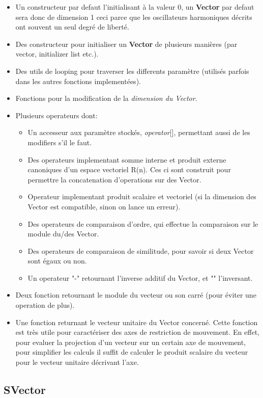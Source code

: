 \documentclass{report}
\begin{document}
\begin{itemize}
\item Un constructeur par defaut l'initialisant à la valeur {0}, un \textbf{Vector} par defaut sera donc de dimension 1
   ceci parce que les oscillateurs harmoniques décrits ont souvent un seul degré de liberté.
\item Des constructeur pour initialiser un \textbf{Vector} de plusieurs manières (par vector, initializer list etc.).
\item Des utils de looping pour traverser les differents paramètre (utilisés parfois dans les autres fonctions implementées).
\item Fonctions pour la modification de la \textit{dimension du Vector}.
\item Plusieurs operateurs dont:
    \begin{itemize}
	\item Un accesseur aux paramètre stockés, \textit{operator}[], permettant aussi de les modifiers s'il le faut.	
	\item Des operateurs implementant somme interne et produit externe canoniques d'un espace vectoriel R(n). Ces ci sont construit pour permettre la concatenation d'operations sur des Vector.
	\item Operateur implementant produit scalaire et vectoriel (si la dimension des Vector est compatible, sinon on lance un erreur).
	\item Des operateurs de comparaison d'ordre, qui effectue la comparaison sur le module du/des Vector.
	\item Des operateurs de comparaison de similitude, pour savoir si deux Vector sont égaux ou non.
	\item Un operateur "-" retournant l'inverse additif du Vector, et "\detokenize{~}" l'inversant.
    \end{itemize}
\item Deux fonction retournant le module du vecteur ou son carré (pour éviter une operation de plus).
\item Une fonction returnant le vecteur unitaire du Vector concerné. Cette fonction est très utile pour caractériser des axes de restriction de mouvement.
   En effet, pour evaluer la projection d'un vecteur sur un certain axe de mouvement, pour simplifier les calculs il suffit de calculer le produit scalaire
   du vecteur pour le vecteur unitaire décrivant l'axe.
\end{itemize}

\subsection{SVector}
\end{document}
